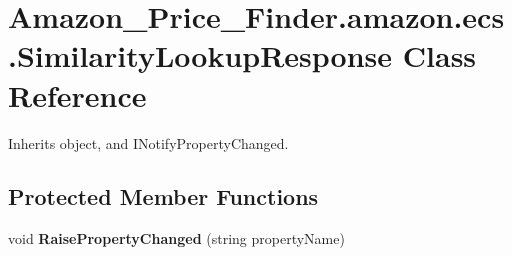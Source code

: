 \hypertarget{class_amazon___price___finder_1_1amazon_1_1ecs_1_1_similarity_lookup_response}{\section{Amazon\-\_\-\-Price\-\_\-\-Finder.\-amazon.\-ecs.\-Similarity\-Lookup\-Response Class Reference}
\label{class_amazon___price___finder_1_1amazon_1_1ecs_1_1_similarity_lookup_response}
}


 




Inherits object, and I\-Notify\-Property\-Changed.

\subsection*{Protected Member Functions}
\begin{DoxyCompactItemize}
\item 
\hypertarget{class_amazon___price___finder_1_1amazon_1_1ecs_1_1_similarity_lookup_response_aec1aaaf9a661c079ae783835a48e991e}{void {\bfseries Raise\-Property\-Changed} (string property\-Name)}\label{class_amazon___price___finder_1_1amazon_1_1ecs_1_1_similarity_lookup_response_aec1aaaf9a661c079ae783835a48e991e}

\end{DoxyCompactItemize}
